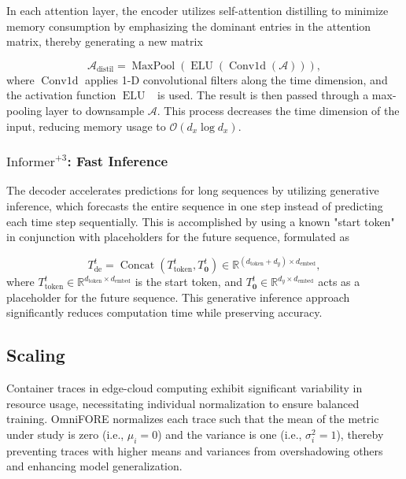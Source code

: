 \documentclass{ieeetmlcn}
\begin{document}
In each attention layer, the encoder utilizes self-attention distilling to minimize memory consumption by emphasizing the dominant entries in the attention matrix, thereby generating a new matrix

\begin{equation}
\mathcal{A}_{\text{distil}} = \operatorname{MaxPool}\left(\operatorname{ELU}\left(\operatorname{Conv1d}\left(\mathcal{A}\right)\right)\right),
\end{equation}
where $\operatorname{Conv1d}$ applies 1-D convolutional filters along the time dimension, and the activation function $\operatorname{ELU}$~\cite{al2023fhic} is used. The result is then passed through a max-pooling layer to downsample $\mathcal{A}$. This process decreases the time dimension of the input, reducing memory usage to $\mathcal{O}(d_x \log d_x)$.

\subsubsection*{$\text{Informer}^{+3}$: Fast Inference}

The decoder accelerates predictions for long sequences by utilizing generative inference, which forecasts the entire sequence in one step instead of predicting each time step sequentially. This is accomplished by using a known "start token" in conjunction with placeholders for the future sequence, formulated as

\begin{equation}
T_{\mathrm{de}}^{t} = \operatorname{Concat}\left(T_{\text{token}}^{t}, T_{\mathbf{0}}^{t}\right) \in \mathbb{R}^{(d_{\text{token}} + d_y) \times d_{\text{embed}}},
\end{equation}
where $T_{\text{token}}^{t} \in \mathbb{R}^{d_{\text{token}} \times d_{\text{embed}}}$ is the start token, and $T_{\mathbf{0}}^{t} \in \mathbb{R}^{d_y \times d_{\text{embed}}}$ acts as a placeholder for the future sequence. This generative inference approach significantly reduces computation time while preserving accuracy.



\subsection{Scaling}

Container traces in edge-cloud computing exhibit significant variability in resource usage, necessitating individual normalization to ensure balanced training. OmniFORE normalizes each trace such that the mean of the metric under study is zero (i.e., $\mu_i=0$) and the variance is one (i.e., $\sigma_i^2=1$), thereby preventing traces with higher means and variances from overshadowing others and enhancing model generalization.
\end{document}
